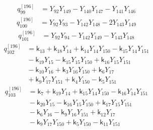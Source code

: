 \begin{equation}\label{q196:row:099}
\begin{aligned}
q_{99}^{[196]} &={} Y_{92}Y_{149} - Y_{140}Y_{147} - Y_{141}Y_{146}
\end{aligned}
\end{equation}
\begin{equation}\label{q196:row:100}
\begin{aligned}
q_{100}^{[196]} &={} Y_{92}Y_{93} - Y_{142}Y_{148} - 2Y_{143}Y_{149}
\end{aligned}
\end{equation}
\begin{equation}\label{q196:row:101}
\begin{aligned}
q_{101}^{[196]} &={} Y_{92}Y_{94} - Y_{142}Y_{149} - Y_{143}Y_{148}
\end{aligned}
\end{equation}
\begin{equation}\label{q196:row:102}
\begin{aligned}
q_{102}^{[196]} &={} \mathsf{k}_{13} + \mathsf{k}_{18}Y_{14} + \mathsf{k}_{14}Y_{14}Y_{150} - \mathsf{k}_{15}Y_{14}Y_{151}\\
&{} - \mathsf{k}_{19}Y_{15} - \mathsf{k}_{15}Y_{15}Y_{150} + \mathsf{k}_{16}Y_{15}Y_{151}\\
&{} - \mathsf{k}_{10}Y_{16} + \mathsf{k}_{3}Y_{16}Y_{150} + \mathsf{k}_{6}Y_{17}\\
&{} + \mathsf{k}_{9}Y_{17}Y_{151} + \mathsf{k}_{4}Y_{150} - \mathsf{k}_{5}Y_{151}
\end{aligned}
\end{equation}
\begin{equation}\label{q196:row:103}
\begin{aligned}
q_{103}^{[196]} &={} \mathsf{k}_{7} + \mathsf{k}_{19}Y_{14} + \mathsf{k}_{15}Y_{14}Y_{150} - \mathsf{k}_{16}Y_{14}Y_{151}\\
&{} - \mathsf{k}_{20}Y_{15} - \mathsf{k}_{16}Y_{15}Y_{150} + \mathsf{k}_{17}Y_{15}Y_{151}\\
&{} - \mathsf{k}_{6}Y_{16} - \mathsf{k}_{9}Y_{16}Y_{151} + \mathsf{k}_{12}Y_{17}\\
&{} - \mathsf{k}_{9}Y_{17}Y_{150} + \mathsf{k}_{5}Y_{150} - \mathsf{k}_{11}Y_{151}
\end{aligned}
\end{equation}
